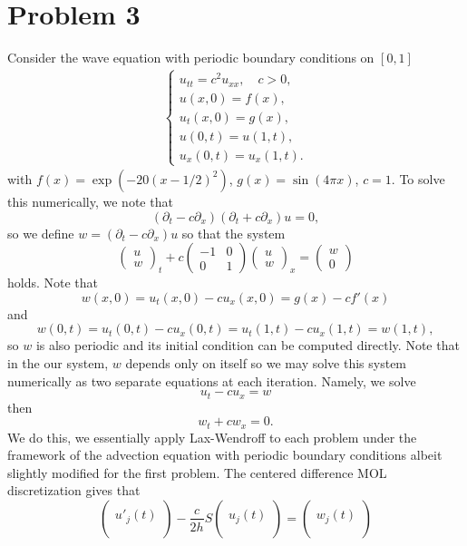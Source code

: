 \documentclass{article}
\begin{document}
\section{Problem 3}
Consider the wave equation with periodic boundary conditions on $[0,1]$
\begin{align*}
	\begin{cases}
		u_{tt} = c^2 u_{xx}, \quad c > 0,\\
		u(x,0) = f(x),\\
		u_t(x,0) = g(x),\\
		u(0,t) = u(1,t),\\
		u_x(0,t) = u_x(1,t).
	\end{cases}
\end{align*}
with $f(x) = \exp( -20(x-1/2)^2 )$, $g(x) = \sin(4\pi x)$, $c = 1$. To solve this numerically, we note that 
\[
(\partial_t-c\partial_x)(\partial_t+c\partial_x)u=0,
\]
so we define $w=(\partial_t-c\partial_x)u$ so that the system 
\[
\begin{pmatrix}
u\\w
\end{pmatrix}_t+c\begin{pmatrix}
-1 &0\\0&1
\end{pmatrix}\begin{pmatrix}
u\\w
\end{pmatrix}_x=\begin{pmatrix}
w\\0
\end{pmatrix}
\]
holds. Note that 
\[
w(x,0)=u_t(x,0)-cu_x(x,0)=g(x)-cf'(x)
\]
and 
\[
w(0,t)=u_t(0,t)-cu_x(0,t)=u_t(1,t)-cu_x(1,t)=w(1,t),
\]
so $w$ is also periodic and its initial condition can be computed directly. Note that in the our system, $w$ depends only on itself so we may solve this system numerically as two separate equations at each iteration. Namely, we solve 
\[
u_t-cu_x=w
\]
then
\[
w_t+cw_x=0.
\]
We do this, we essentially apply Lax-Wendroff to each problem under the framework of the advection equation with periodic boundary conditions albeit slightly modified for the first problem. The centered difference MOL discretization gives that
\[
\begin{pmatrix}
\\	u'_j(t) \\ \\
\end{pmatrix}-\frac{c}{2h}S\begin{pmatrix}
\\	u_j(t) \\ \\
\end{pmatrix}=\begin{pmatrix}
\\	w_j(t) \\ \\
\end{pmatrix}
\] 
\end{document}
